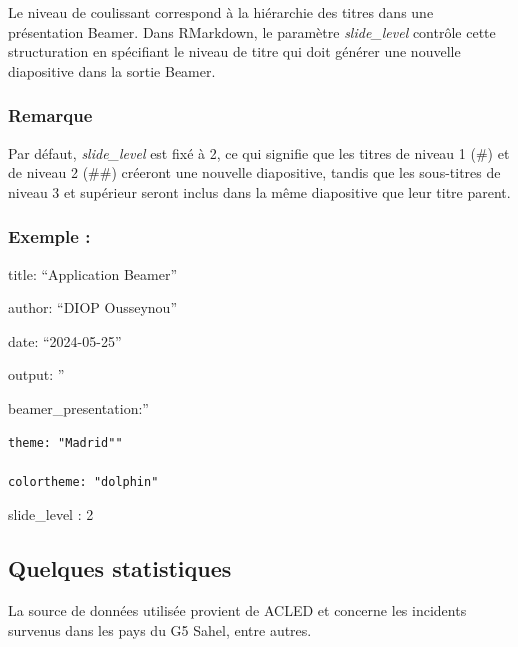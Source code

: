 \documentclass[
  12pt,
]{article}
\begin{document}
Le niveau de coulissant correspond à la hiérarchie des titres dans une
présentation Beamer. Dans RMarkdown, le paramètre \emph{slide\_level}
contrôle cette structuration en spécifiant le niveau de titre qui doit
générer une nouvelle diapositive dans la sortie Beamer.

\subsubsection{Remarque}\label{remarque}

Par défaut, \emph{slide\_level} est fixé à 2, ce qui signifie que les
titres de niveau 1 (\#) et de niveau 2 (\#\#) créeront une nouvelle
diapositive, tandis que les sous-titres de niveau 3 et supérieur seront
inclus dans la même diapositive que leur titre parent.

\subsubsection{Exemple :}\label{exemple-1}

title: ``Application Beamer''

author: ``DIOP Ousseynou''

date: ``2024-05-25''

output: ''

beamer\_presentation:''

\begin{verbatim}
theme: "Madrid"" 

colortheme: "dolphin"
\end{verbatim}

slide\_level : 2

\subsection{Quelques statistiques}\label{quelques-statistiques}

La source de données utilisée provient de ACLED et concerne les
incidents survenus dans les pays du G5 Sahel, entre autres.
\end{document}
